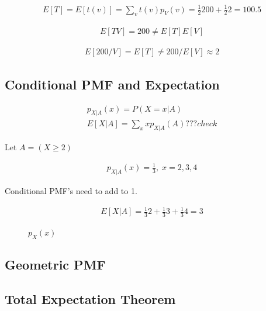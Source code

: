 \begin{align*}
E[T] = E[t(v)] = \sum_v t(v)p_V(v) = \frac{1}{2}200 + \frac{1}{2}2 = 100.5
\end{align*}

\begin{align*}
E[TV] = 200 \ne E[T]E[V]
\end{align*}

\begin{align*}
E[200/V] = E[T] \ne 200/E[V] \approx 2
\end{align*}

\subsection{Conditional PMF and Expectation}


\begin{align*}
p_{X|A}(x) = P(X=x|A)\\
E[X|A] = \sum_x x p_{X|A}(A) ???check
\end{align*}

Let $A=(X \ge 2)$

\begin{align*}
p_{X|A}(x) = \frac{1}{3},\; x=2,3,4
\end{align*}

Conditional PMF's need to add to 1.

\begin{align*}
E[X|A] = \frac{1}{3}2 + \frac{1}{3}3 + \frac{1}{3}4=3
\end{align*}


\begin{figure}[ht]
\centering
{}
\caption{$p_X(x)$}
\end{figure}


\subsection{Geometric PMF}

\subsection{Total Expectation Theorem}

